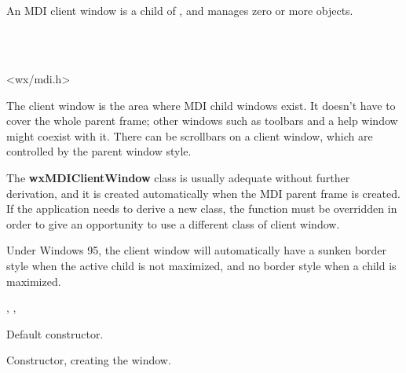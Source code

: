 \section{}\label{wxmdiclientwindow}

An MDI client window is a child of , and manages zero or
more  objects.


\\
\\


<wx/mdi.h>


The client window is the area where MDI child windows exist. It doesn't have to cover the whole
parent frame; other windows such as toolbars and a help window might coexist with it.
There can be scrollbars on a client window, which are controlled by the parent window style.

The {\bf wxMDIClientWindow} class is usually adequate without further derivation, and it is created
automatically when the MDI parent frame is created. If the application needs to derive a new class,
the function  must be
overridden in order to give an opportunity to use a different class of client window.

Under Windows 95, the client window will automatically have a sunken border style when
the active child is not maximized, and no border style when a child is maximized.


, ,\rtfsp
{}


\label{wxmdiclientwindowconstr}


Default constructor.


Constructor, creating the window.

